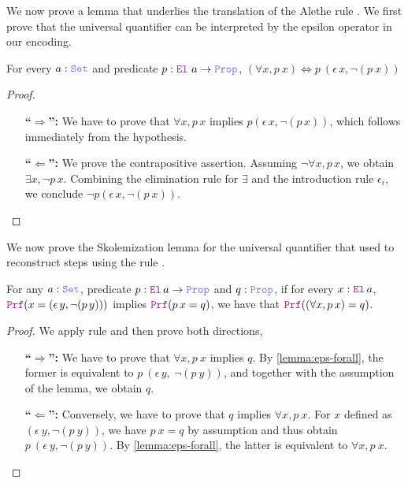 We now prove a lemma that underlies the translation of the Alethe rule .
We first prove that the universal quantifier can be interpreted by the epsilon operator in our encoding.

\smallskip

\begin{lemma}\label{lemma:eps-forall}
For every $a : \set$ and predicate $p: \el~a \ra \prop$, $(\forall x, p~x) \Leftrightarrow p~(\epsilon\,x, \neg (p~x))$
\end{lemma}
\begin{proof}
\begin{itemize}
\item[\textbf{``$\Rightarrow$'':}]  We have to prove that $\forall x, p\,x$ implies $p(\epsilon\,x, \neg (p\,x))$, which follows immediately from the hypothesis.
\item[\textbf{``$\Leftarrow$'':}]  We prove the contrapositive assertion. Assuming $\neg \forall x, p\,x$, we obtain $\exists x, \neg p\,x$. Combining the elimination rule for $\exists$ and the introduction rule $\epsilon_i$, we conclude $\neg p(\epsilon\,x, \neg (p~x))$.
\end{itemize}
\end{proof}

We now prove the Skolemization lemma for the universal quantifier that used to reconstruct steps using the rule .

\smallskip

\begin{lemma}\label{lem:sko-forall}
For any $a : \set$, predicate $p : \el{}\,a \ra \prop$ and $q : \prop$, if for every $x: \el{}\,a$, $\prf (x = (\epsilon \, y, \neg (p\,y)))$ implies $\prf (p\,x = q)$,  we have that $\prf ((\forall x, p\,x) = q)$.
\end{lemma}
\begin{proof} We apply rule  and then prove both directions,
\begin{itemize}
\item[\textbf{``$\Rightarrow$'':}]  We have to prove that $\forall x, p~x$ implies $q$. By \cref{lemma:eps-forall}, the former is equivalent to $p~(\epsilon\,y,~\neg (p~y))$, and together with the assumption of the lemma, we obtain $q$.
\item[\textbf{``$\Leftarrow$'':}]  Conversely, we have to prove that $q$ implies $\forall x, p~x$. For $x$ defined as $(\epsilon~y, \neg (p~y))$, we have $p~x = q$ by assumption and thus obtain $p~(\epsilon~y, \neg (p~y))$. By \cref{lemma:eps-forall}, the latter is equivalent to $\forall x, p~x$.
\end{itemize}
\end{proof}

